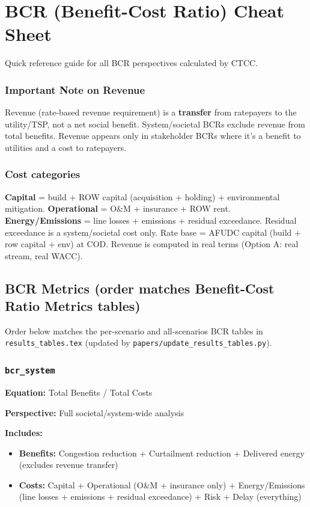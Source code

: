 \documentclass[ctcc_full_documentation.tex]{subfiles}
\begin{document}
\chapter{BCR (Benefit-Cost Ratio) Cheat Sheet}

Quick reference guide for all BCR perspectives calculated by CTCC.

\subsection*{Important Note on Revenue}
Revenue (rate-based revenue requirement) is a \textbf{transfer} from ratepayers to the utility/TSP, not a net social benefit. System/societal BCRs exclude revenue from total benefits. Revenue appears only in stakeholder BCRs where it's a benefit to utilities and a cost to ratepayers.

\subsection*{Cost categories}
\textbf{Capital} = build + ROW capital (acquisition + holding) + environmental mitigation. \textbf{Operational} = O\&M + insurance + ROW rent. \textbf{Energy/Emissions} = line losses + emissions + residual exceedance. Residual exceedance is a system/societal cost only. Rate base = AFUDC capital (build + row capital + env) at COD. Revenue is computed in real terms (Option A: real stream, real WACC).

\section{BCR Metrics (order matches Benefit-Cost Ratio Metrics tables)}

Order below matches the per-scenario and all-scenarios BCR tables in \texttt{results\_tables.tex} (updated by \texttt{papers/update\_results\_tables.py}).

\subsection{\texttt{bcr\_system}}

\textbf{Equation:} Total Benefits / Total Costs

\textbf{Perspective:} Full societal/system-wide analysis

\textbf{Includes:}
\begin{itemize}
\item \textbf{Benefits:} Congestion reduction + Curtailment reduction + Delivered energy (excludes revenue transfer)
\item \textbf{Costs:} Capital + Operational (O\&M + insurance only) + Energy/Emissions (line losses + emissions + residual exceedance) + Risk + Delay (everything)
\end{itemize}
\end{document}

